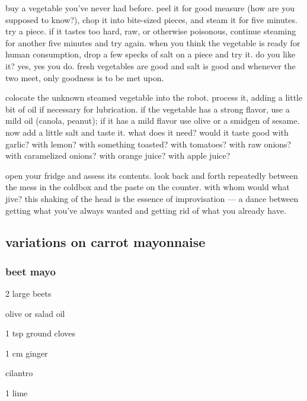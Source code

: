 \begin{algorithm}
  \item buy a vegetable you've never had before. peel it for good measure (how 
  are you supposed to know?), chop it into bite-sized pieces, and steam it for 
  five minutes. try a piece. if it tastes too hard, raw, or otherwise 
  poisonous, continue steaming for another five minutes and try again. when 
  you think the vegetable is ready for human consumption, drop a few specks of 
  salt on a piece and try it. do you like it? yes, yes you do. fresh 
  vegetables are good and salt is good and whenever the two meet, only 
  goodness is to be met upon.

  \item colocate the unknown steamed vegetable into the robot. process it, 
  adding a little bit of oil if necessary for lubrication. if the vegetable 
  has a strong flavor, use a mild oil (canola, peanut); if it has a mild 
  flavor use olive  or a smidgen of sesame. now add a little salt and taste 
  it. what does it need? would it taste good with garlic? with lemon? with 
  something toasted? with tomatoes? with raw onions? with caramelized onions? 
  with orange juice? with apple juice?

  \item open your fridge and assess its contents. look back and forth 
  repeatedly between the mess in the coldbox and the paste on the counter. 
  with whom would what jive? this shaking of the head is the essence of 
  improvisation --- a dance between getting what you've always wanted and 
  getting rid of what you already have.

\end{algorithm}

\subsection{variations on carrot mayonnaise}

\subsubsection{beet mayo}

\begin{ingredients}
  \item 2 large beets
  \item olive or salad oil
  \item 1 tsp ground cloves
  \item 1 cm ginger
  \item cilantro
  \item 1 lime
\end{ingredients}

